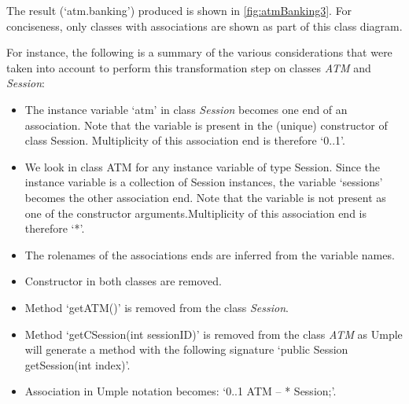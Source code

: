 The result (`atm.banking') produced is shown in \ref{fig:atmBanking3}. For conciseness, only classes with associations are shown as part of this class diagram. 

For instance, the following is a summary of the various considerations that were taken into account to perform this transformation step on classes \textit{ATM} and \textit{Session}:

\begin{itemize}
\item The instance variable `atm' in class \textit{Session} becomes one end of an association. 
Note that the variable is present in the (unique) constructor of class Session. Multiplicity of this association end is therefore `0..1'.
\item We look in class ATM for any instance variable of type Session. Since the instance variable is a collection of Session instances, the variable `sessions' becomes the other association end. Note that the variable is not present as one of the constructor arguments.Multiplicity of this association end is therefore `*'.
\item The rolenames of the associations ends are inferred from the variable names.
\item Constructor in both classes are removed.
\item Method `getATM()' is removed from the class \textit{Session}.
\item Method `getCSession(int sessionID)' is removed from the class \textit{ATM} as Umple will generate a method with the following signature `public Session getSession(int index)'.
\item Association in Umple notation becomes:  `0..1 ATM --  * Session;'.
\end{itemize}

